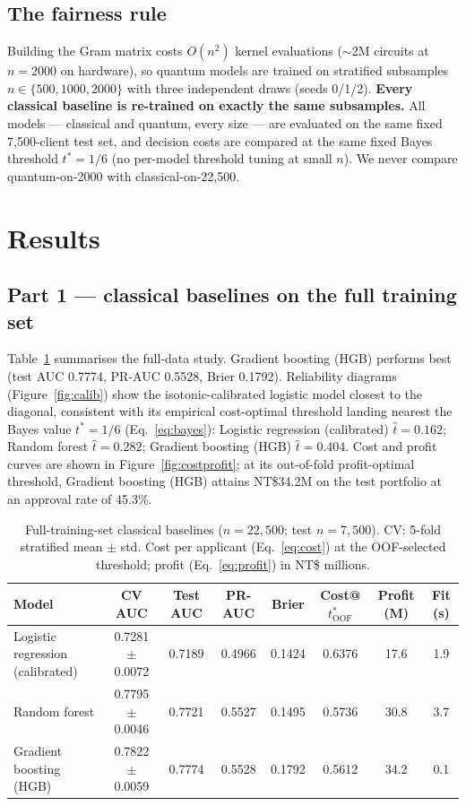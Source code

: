 \documentclass[11pt]{article}
\begin{document}
\subsection{The fairness rule}
Building the Gram matrix costs $O(n^2)$ kernel evaluations ($\sim$2M circuits
at $n = 2000$ on hardware), so quantum models are trained on stratified
subsamples $n \in \{500, 1000, 2000\}$ with three independent draws (seeds 0/1/2).
\textbf{Every classical baseline is re-trained on exactly the same
subsamples.} All models --- classical and quantum, every size --- are
evaluated on the same fixed 7,500-client test set, and decision costs are
compared at the same fixed Bayes threshold $t^\ast = 1/6$ (no per-model
threshold tuning at small $n$). We never compare quantum-on-2000 with
classical-on-22,500.

\section{Results}
\subsection{Part 1 --- classical baselines on the full training set}
Table~\ref{tab:full} summarises the full-data study.
Gradient boosting (HGB) performs best (test AUC 0.7774, PR-AUC 0.5528,
Brier 0.1792). Reliability diagrams (Figure~\ref{fig:calib}) show
the isotonic-calibrated logistic model closest to the diagonal, consistent
with its empirical cost-optimal threshold landing nearest the Bayes value
$t^\ast = 1/6$ (Eq.~\ref{eq:bayes}): Logistic regression (calibrated) $\hat t = 0.162$; Random forest $\hat t = 0.282$; Gradient boosting (HGB) $\hat t = 0.404$. Cost and profit curves are
shown in Figure~\ref{fig:costprofit}; at its out-of-fold profit-optimal
threshold, Gradient boosting (HGB) attains NT\$34.2M on the test portfolio
at an approval rate of 45.3\%.

\begin{table}[t]
\centering\small
\caption{Full-training-set classical baselines ($n=22,500$; test
$n=7,500$). CV: 5-fold stratified mean $\pm$ std. Cost per applicant
(Eq.~\ref{eq:cost}) at the OOF-selected threshold; profit (Eq.~\ref{eq:profit})
in NT\$ millions.}
\label{tab:full}
\begin{tabular}{lccccccc}
\toprule
Model & CV AUC & Test AUC & PR-AUC & Brier & Cost@$t^\ast_{\text{OOF}}$ &
Profit (M) & Fit (s) \\
\midrule
Logistic regression (calibrated) & 0.7281 $\pm$ 0.0072 & 0.7189 & 0.4966 & 0.1424 & 0.6376 & 17.6 & 1.9 \\
Random forest & 0.7795 $\pm$ 0.0046 & 0.7721 & 0.5527 & 0.1495 & 0.5736 & 30.8 & 3.7 \\
Gradient boosting (HGB) & 0.7822 $\pm$ 0.0059 & 0.7774 & 0.5528 & 0.1792 & 0.5612 & 34.2 & 0.1 \\
\bottomrule
\end{tabular}
\end{table}
\end{document}
